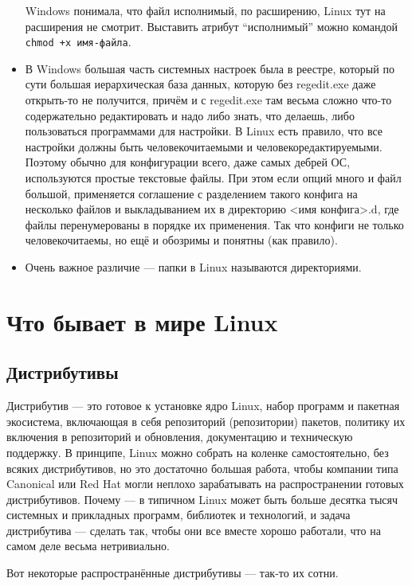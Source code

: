 \documentclass{../../text-style}
\begin{document}
\begin{itemize}
        Windows понимала, что файл исполнимый, по расширению, Linux тут на расширения не смотрит.
        Выставить атрибут \enquote{исполнимый} можно командой \texttt{chmod +x имя-файла}.
    \item В Windows большая часть системных настроек была в реестре, который по сути большая иерархическая база данных, которую без regedit.exe даже открыть-то не получится, причём и с regedit.exe там весьма сложно что-то содержательно редактировать и надо либо знать, что делаешь, либо пользоваться программами для настройки.
        В Linux есть правило, что все настройки должны быть человекочитаемыми и человекоредактируемыми.
        Поэтому обычно для конфигурации всего, даже самых дебрей ОС, используются простые текстовые файлы.
        При этом если опций много и файл большой, применяется соглашение с разделением такого конфига на несколько файлов и выкладыванием их в директорию <имя конфига>.d, где файлы перенумерованы в порядке их применения.
        Так что конфиги не только человекочитаемы, но ещё и обозримы и понятны (как правило).
    \item Очень важное различие --- папки в Linux называются директориями.
\end{itemize}

\section{Что бывает в мире Linux}

\subsection{Дистрибутивы}

Дистрибутив --- это готовое к установке ядро Linux, набор программ и пакетная экосистема, включающая в себя репозиторий (репозитории) пакетов, политику их включения в репозиторий и обновления, документацию и техническую поддержку.
В принципе, Linux можно собрать на коленке самостоятельно, без всяких дистрибутивов, но это достаточно большая работа, чтобы компании типа Canonical или Red Hat могли неплохо зарабатывать на распространении готовых дистрибутивов.
Почему --- в типичном Linux может быть больше десятка тысяч системных и прикладных программ, библиотек и технологий, и задача дистрибутива --- сделать так, чтобы они все вместе хорошо работали, что на самом деле весьма нетривиально.

Вот некоторые распространённые дистрибутивы --- так-то их сотни.
\end{document}
